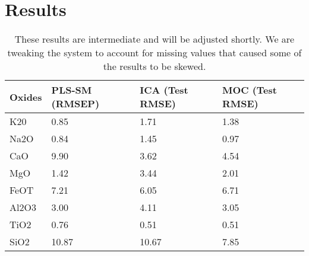 \section{Results}\label{sec:results}

\begin{table}[!ht]
    \centering
    \begin{tabular}{|l|l|l|l|}
    \hline
        Oxides & PLS-SM (RMSEP) & ICA (Test RMSE) & MOC (Test RMSE) \\ \hline
        K20 & 0.85 & 1.71 & 1.38 \\ \hline
        Na2O & 0.84 & 1.45 & 0.97 \\ \hline
        CaO & 9.90 & 3.62 & 4.54 \\ \hline
        MgO & 1.42 & 3.44 & 2.01 \\ \hline
        FeOT & 7.21 & 6.05 & 6.71 \\ \hline
        Al2O3 & 3.00 & 4.11 & 3.05 \\ \hline
        TiO2 & 0.76 & 0.51 & 0.51 \\ \hline
        SiO2 & 10.87 & 10.67 & 7.85 \\ \hline
    \end{tabular}
    \caption{These results are intermediate and will be adjusted shortly. We are tweaking the system to account for missing values that caused some of the results to be skewed.}
\end{table}


